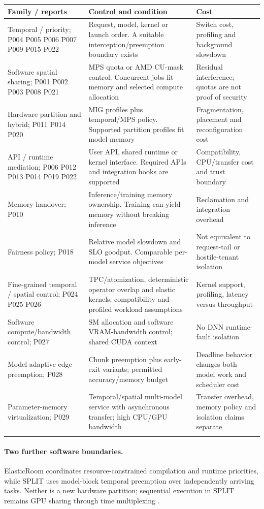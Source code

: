 \begin{longtable}{>{\raggedright\arraybackslash}p{}>{\raggedright\arraybackslash}p{}>{\raggedright\arraybackslash}p{}}
\toprule
\textbf{Family / reports} & \textbf{Control and condition} & \textbf{Cost}\\\midrule\endhead
Temporal / priority; P004 P005 P006 P007 P009 P015 P022 & Request, model, kernel or launch order. A suitable interception/preemption boundary exists & Switch cost, profiling and background slowdown\\\addlinespace
Software spatial sharing; P001 P002 P003 P008 P021 & MPS quota or AMD CU-mask control. Concurrent jobs fit memory and selected compute allocation & Residual interference; quotas are not proof of security\\\addlinespace
Hardware partition and hybrid; P011 P014 P020 & MIG profiles plus temporal/MPS policy. Supported partition profiles fit model memory & Fragmentation, placement and reconfiguration cost\\\addlinespace
API / runtime mediation; P006 P012 P013 P014 P019 P022 & User API, shared runtime or kernel interface. Required APIs and integration hooks are supported & Compatibility, CPU/transfer cost and trust boundary\\\addlinespace
Memory handover; P010 & Inference/training memory ownership. Training can yield memory without breaking inference & Reclamation and integration overhead\\\addlinespace
Fairness policy; P018 & Relative model slowdown and SLO goodput. Comparable per-model service objectives & Not equivalent to request-tail or hostile-tenant isolation\\\addlinespace
Fine-grained temporal / spatial control; P024 P025 P026 & TPC/atomization, deterministic operator overlap and elastic kernels; compatibility and profiled workload assumptions & Kernel support, profiling, latency versus throughput\\\addlinespace
Software compute/bandwidth control; P027 & SM allocation and software VRAM-bandwidth control; shared CUDA context & No DNN runtime-fault isolation\\\addlinespace
Model-adaptive edge preemption; P028 & Chunk preemption plus early-exit variants; permitted accuracy/memory budget & Deadline behavior changes both model work and scheduler cost\\\addlinespace
Parameter-memory virtualization; P029 & Temporal/spatial multi-model service with asynchronous transfer; high CPU/GPU bandwidth & Transfer overhead, memory policy and isolation claims separate\\\addlinespace
\bottomrule\end{longtable}\paragraph{Two further software boundaries.} ElasticRoom coordinates resource-constrained compilation and runtime priorities, while SPLIT uses model-block temporal preemption over independently arriving tasks. Neither is a new hardware partition; sequential execution in SPLIT remains GPU sharing through time multiplexing \cite{s028,s029}.

